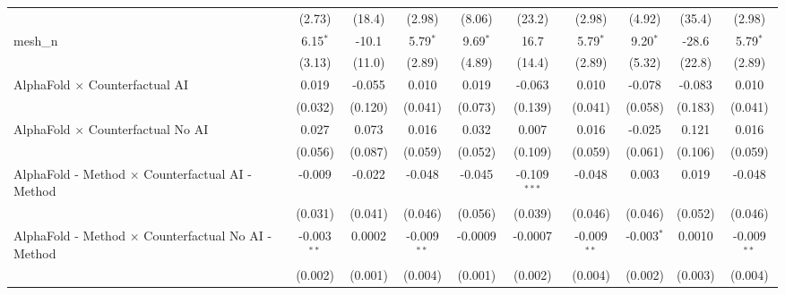 \begin{tabular}{lccccccccc}
                                                               & (2.73)        & (18.4)        & (2.98)        & (8.06)        & (23.2)         & (2.98)        & (4.92)        & (35.4)        & (2.98)\\   
   mesh\_n                                                     & 6.15$^{*}$    & -10.1         & 5.79$^{*}$    & 9.69$^{*}$    & 16.7           & 5.79$^{*}$    & 9.20$^{*}$    & -28.6         & 5.79$^{*}$\\   
                                                               & (3.13)        & (11.0)        & (2.89)        & (4.89)        & (14.4)         & (2.89)        & (5.32)        & (22.8)        & (2.89)\\   
   AlphaFold $\times$ Counterfactual AI                        & 0.019         & -0.055        & 0.010         & 0.019         & -0.063         & 0.010         & -0.078        & -0.083        & 0.010\\   
                                                               & (0.032)       & (0.120)       & (0.041)       & (0.073)       & (0.139)        & (0.041)       & (0.058)       & (0.183)       & (0.041)\\   
   AlphaFold $\times$ Counterfactual No AI                     & 0.027         & 0.073         & 0.016         & 0.032         & 0.007          & 0.016         & -0.025        & 0.121         & 0.016\\   
                                                               & (0.056)       & (0.087)       & (0.059)       & (0.052)       & (0.109)        & (0.059)       & (0.061)       & (0.106)       & (0.059)\\   
   AlphaFold - Method $\times$ Counterfactual AI - Method      & -0.009        & -0.022        & -0.048        & -0.045        & -0.109$^{***}$ & -0.048        & 0.003         & 0.019         & -0.048\\   
                                                               & (0.031)       & (0.041)       & (0.046)       & (0.056)       & (0.039)        & (0.046)       & (0.046)       & (0.052)       & (0.046)\\   
   AlphaFold - Method $\times$ Counterfactual No AI - Method   & -0.003$^{**}$ & 0.0002        & -0.009$^{**}$ & -0.0009       & -0.0007        & -0.009$^{**}$ & -0.003$^{*}$  & 0.0010        & -0.009$^{**}$\\   
                                                               & (0.002)       & (0.001)       & (0.004)       & (0.001)       & (0.002)        & (0.004)       & (0.002)       & (0.003)       & (0.004)\\   

\end{tabular}
